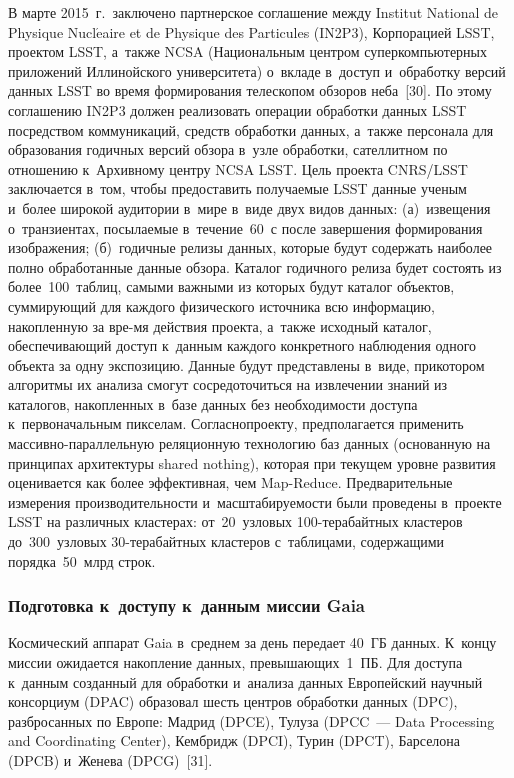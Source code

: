 \begin{multicols}{2}
  В марте 2015~г.\ заключено партнерское соглашение между Institut National de Physique 
Nucl$\acute{\mbox{e}}$aire et de Physique des Particules (IN2P3), Корпорацией LSST, проектом LSST, а~также 
NCSA (Национальным центром суперкомпьютерных приложений Иллинойского 
университета) о~вкладе в~доступ и~обработку версий данных LSST во время формирования 
телескопом обзоров неба~[30]. По этому соглашению IN2P3 должен реализовать операции 
обработки данных LSST посредством коммуникаций, средств обработки данных, а~так\-же 
персонала для образования годичных версий обзора в~узле обработки, сателлитном по 
отношению к~Архивному центру NCSA LSST. Цель проекта CNRS/LSST заключается 
в~том, чтобы предоставить получаемые LSST данные ученым и~более широкой аудитории 
в~мире в~виде двух видов данных: (а)~извещения о~транзиентах, посылаемые 
в~течение~60~с после завершения формирования изображения; (б)~годичные релизы 
данных, которые будут содержать наиболее полно обработанные данные обзора. Каталог\linebreak 
годичного релиза будет состоять из более~100~таб\-лиц, самыми важными из которых 
будут каталог объектов, суммирующий для каждого физического источника всю 
информацию, накопленную за вре-\linebreak мя действия проекта, а~также исходный каталог, 
обеспечивающий доступ к~данным каждого конкретного наблюдения одного объекта за 
одну экспозицию. Данные будут представлены в~виде, при\linebreak котором алгоритмы их анализа 
смогут сосредоточиться на извлечении знаний из каталогов, накопленных в~базе данных 
без необходимости до\-ступа к~первоначальным пикселам. Согласно\linebreak проекту, 
предполагается применить мас\-сив\-но-па\-рал\-лель\-ную реляционную технологию баз 
данных (основанную на принципах архитектуры shared nothing), которая при текущем 
уровне развития оценивается как более эффективная, чем Map-Reduce. Предварительные 
измерения производительности и~масштабируемости были проведены в~проекте LSST на 
различных кластерах: от~20~узловых 100-те\-ра\-байт\-ных кластеров до~300~узловых 30-те\-ра\-байт\-ных
кластеров 
с~таблицами, содержащими порядка~50~млрд строк.

\subsubsection{Подготовка к~доступу к~данным миссии Gaia}

  Космический аппарат Gaia в~среднем за день передает 40~ГБ данных. К~концу миссии 
ожидается накопление данных, превышающих~1~ПБ. Для доступа к~данным 
созданный для обработки и~анализа данных Европейский научный консорциум (DPAC) 
образовал шесть центров обработки данных (DPC), разбросанных по Европе: Мадрид 
(DPCE), Тулуза (DPCC~--- Data Processing and Coordinating Center), 
Кембридж (DPCI), Турин (DPCT), Барселона (DPCB) и~Женева 
(DPCG)~[31].
  

\end{multicols}
